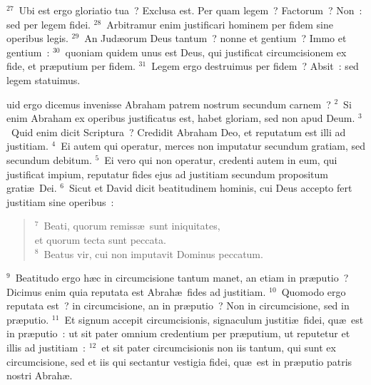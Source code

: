 ${}^{27}$~Ubi est ergo gloriatio tua~? Exclusa est. Per quam legem~? Factorum~? Non~: sed per legem fidei.
${}^{28}$~Arbitramur enim justificari hominem per fidem sine operibus legis.
${}^{29}$~An Jud\ae orum Deus tantum~? nonne et gentium~? Immo et gentium~:
${}^{30}$~quoniam quidem unus est Deus, qui justificat circumcisionem ex fide, et pr\ae putium per fidem.
${}^{31}$~Legem ergo destruimus per fidem~? Absit~: sed legem statuimus.

\bchapter
{}uid ergo dicemus invenisse Abraham patrem nostrum secundum carnem~?
${}^{2}$~Si enim Abraham ex operibus justificatus est, habet gloriam, sed non apud Deum.
${}^{3}$~Quid enim dicit Scriptura~? Credidit Abraham Deo, et reputatum est illi ad justitiam.
${}^{4}$~Ei autem qui operatur, merces non imputatur secundum gratiam, sed secundum debitum.
${}^{5}$~Ei vero qui non operatur, credenti autem in eum, qui justificat impium, reputatur fides ejus ad justitiam secundum propositum grati\ae\ Dei.
${}^{6}$~Sicut et David dicit beatitudinem hominis, cui Deus accepto fert justitiam sine operibus~:
\begin{flushleft}\begin{verse}${}^{7}$~Beati, quorum remiss\ae\ sunt iniquitates,\\ et quorum tecta sunt peccata.\\
${}^{8}$~Beatus vir, cui non imputavit Dominus peccatum.\end{verse}\end{flushleft}


${}^{9}$~Beatitudo ergo h\ae c in circumcisione tantum manet, an etiam in pr\ae putio~? Dicimus enim quia reputata est Abrah\ae\ fides ad justitiam.
${}^{10}$~Quomodo ergo reputata est~? in circumcisione, an in pr\ae putio~? Non in circumcisione, sed in pr\ae putio.
${}^{11}$~Et signum accepit circumcisionis, signaculum justiti\ae\ fidei, qu\ae\ est in pr\ae putio~: ut sit pater omnium credentium per pr\ae putium, ut reputetur et illis ad justitiam~:
${}^{12}$~et sit pater circumcisionis non iis tantum, qui sunt ex circumcisione, sed et iis qui sectantur vestigia fidei, qu\ae\ est in pr\ae putio patris nostri Abrah\ae .


